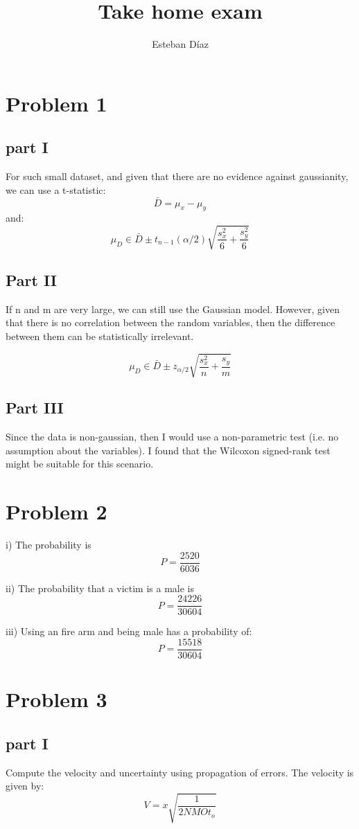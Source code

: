 \documentclass[10pt]{article}
\author{Esteban D\'{i}az}
\title{Take home exam}{}
\begin{document}
\maketitle

\section{Problem 1}
\subsection{part I}
For such small dataset, and given that there are no evidence against 
gaussianity, we can use a t-statistic:
\[
 \bar{D} = \mu_x - \mu_y
\]
and:
\[
 \mu_D \in \bar{D} \pm t_{n-1}(\alpha/2)\sqrt{\frac{s_x^2}{6}+\frac{s_y^2}{6}}
\]

\subsection{Part II}
If n and m are very large, we can still use the Gaussian model. However,
given that there is no correlation between the random variables, then
the difference between them can be statistically irrelevant.

\[
 \mu_D \in \bar{D} \pm z_{\alpha/2}\sqrt{\frac{s_x^2}{n}+\frac{s_y}{m}}
\]

\subsection{Part III}
Since the data is non-gaussian, then I would use a non-parametric test (i.e. no 
assumption about the variables). I found that the Wilcoxon signed-rank test
might be suitable for this scenario.

\section{Problem 2}
i) The probability is 
\[P = \frac{2520}{6036}\]

ii) The probability that a victim is a male is 
\[P = \frac{24226}{30604}\]

iii) Using an fire arm and being male has a probability  of:
\[
  P = \frac{15518}{30604}
\]


\section{Problem 3}
\subsection{part I}
Compute the velocity and uncertainty using propagation of errors.
The velocity is given by:
\[
V = x \sqrt{\frac{1}{2NMO t_o}}
\]
\end{document}
